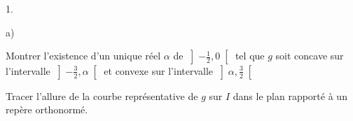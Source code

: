 \documentclass[11pt]{article}%
\begin{document}
\begin{noliste}{1.}
\begin{noliste}{a)}
\item Montrer l'existence d'un unique réel $\alpha$ de $\left] -\frac
{1}{2},0\right[ $ tel que $g$ soit concave sur l'intervalle $\left]
-\frac{3}{2},\alpha \right[ $ et convexe sur l'intervalle $\left]
\alpha,\frac{3}{2}\right[ $

\item Tracer l'allure de la courbe représentative de $g$ sur $I$ dans
le
plan rapporté à un repère orthonormé.
\end{noliste}
\end{noliste}
\end{document}
